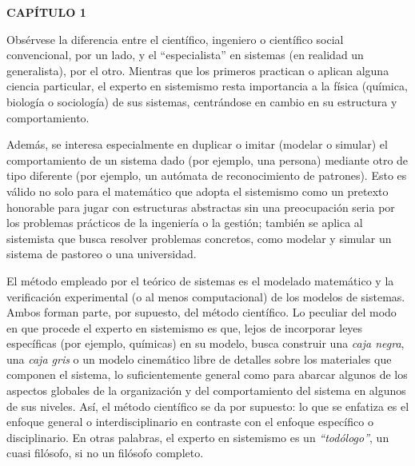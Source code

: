 \newpage

\pagestyle{fancy}
\begin{center}
{\fontsize{16}{18}\selectfont \textbf{CAPÍTULO 1}}\\[0.8cm]
\end{center}

\vspace{0cm}

{\fontsize{13}{15}\selectfont
Obsérvese la diferencia entre el científico, ingeniero o científico social convencional, por un lado, y el “especialista” en sistemas (en realidad un generalista), por el otro. Mientras que los primeros practican o aplican alguna ciencia particular, el experto en sistemismo resta importancia a la física (química, biología o sociología) de sus sistemas, centrándose en cambio en su estructura y comportamiento.

Además, se interesa especialmente en duplicar o imitar (modelar o simular) el comportamiento de un sistema dado (por ejemplo, una persona) mediante otro de tipo diferente (por ejemplo, un autómata de reconocimiento de patrones). Esto es válido no solo para el matemático que adopta el sistemismo como un pretexto honorable para jugar con estructuras abstractas sin una preocupación seria por los problemas prácticos de la ingeniería o la gestión; también se aplica al sistemista que busca resolver problemas concretos, como modelar y simular un sistema de pastoreo o una universidad.

El método empleado por el teórico de sistemas es el modelado matemático y la verificación experimental (o al menos computacional) de los modelos de sistemas. Ambos forman parte, por supuesto, del método científico. Lo peculiar del modo en que procede el experto en sistemismo es que, lejos de incorporar leyes específicas (por ejemplo, químicas) en su modelo, busca construir una \textit{caja negra}, una \textit{caja gris} o un modelo cinemático libre de detalles sobre los materiales que componen el sistema, lo suficientemente general como para abarcar algunos de los aspectos globales de la organización y del comportamiento del sistema en algunos de sus niveles.  
Así, el método científico se da por supuesto: lo que se enfatiza es el enfoque general o interdisciplinario en contraste con el enfoque específico o disciplinario. En otras palabras, el experto en sistemismo es un \textit{“todólogo”}, un cuasi filósofo, si no un filósofo completo.

}
